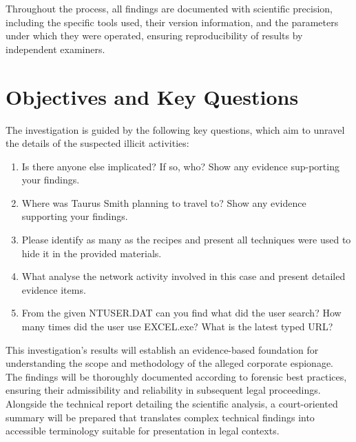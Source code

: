Throughout the process, all findings are documented with scientific precision, including the specific tools used, their version information, and the parameters under which they were operated, ensuring reproducibility of results by independent examiners.

\section{Objectives and Key Questions}
The investigation is guided by the following key questions, which aim to unravel the details of the suspected illicit activities:
\begin{enumerate}
    \item Is there anyone else implicated? If so, who? Show any evidence sup-porting your findings.
    \item Where was Taurus Smith planning to travel to? Show any evidence supporting your findings.
    \item Please identify as many as the recipes and present all techniques were used to hide it in the provided materials.
    \item What analyse the network activity involved in this case and present detailed evidence items.
    \item From the given NTUSER.DAT can you find what did the user search? How many times did the user use EXCEL.exe? What is the latest typed URL?
\end{enumerate}

This investigation's results will establish an evidence-based foundation for understanding the scope and methodology of the alleged corporate espionage. The findings will be thoroughly documented according to forensic best practices, ensuring their admissibility and reliability in subsequent legal proceedings. Alongside the technical report detailing the scientific analysis, a court-oriented summary will be prepared that translates complex technical findings into accessible terminology suitable for presentation in legal contexts.